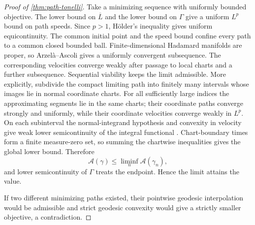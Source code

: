 \begin{proof}[Proof of \cref{thm:path-tonelli}]
Take a minimizing sequence with uniformly bounded objective.  The lower bound
on \(\overline L\) and the lower bound on \(\Gamma\) give a
uniform \(L^p\) bound on path speeds.  Since \(p>1\), H\"older's inequality
gives uniform equicontinuity.  The common initial point and the speed bound
confine every path to a common closed bounded ball.  Finite-dimensional
Hadamard manifolds are proper, so Arzel\`a--Ascoli gives a uniformly convergent
subsequence.  The corresponding velocities converge weakly after passage to
  local charts and a further subsequence.  Sequential viability keeps the limit
  admissible.  More explicitly, subdivide the compact limiting path into
  finitely many intervals whose images lie in normal coordinate charts.  For
  all sufficiently large indices the approximating segments lie in the same
  charts; their coordinate paths converge strongly and uniformly, while their
  coordinate velocities converge weakly in \(L^p\).  On each subinterval the
  normal-integrand hypothesis and convexity in velocity give weak lower
  semicontinuity of the integral functional
  \cite[Chapter~3]{dacorogna2008direct}.  Chart-boundary times form a finite
  measure-zero set, so summing the chartwise inequalities gives the global
  lower bound.  Therefore
\[
  \mathcal A(\gamma)
  \le
  \liminf_n\mathcal A(\gamma_n),
\]
and lower semicontinuity of \(\Gamma\) treats the endpoint.  Hence the limit
attains the value.

If two different minimizing paths existed, their pointwise geodesic
interpolation would be admissible and strict geodesic convexity would give a
strictly smaller objective, a contradiction.
\end{proof}

